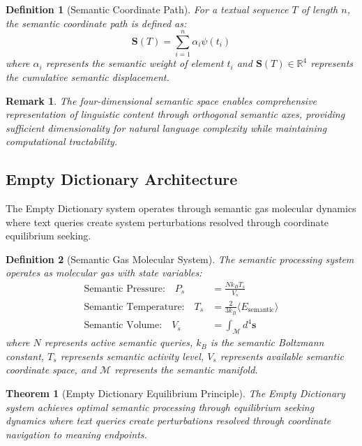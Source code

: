 \documentclass[12pt,a4paper]{article}
\newtheorem{theorem}{Theorem}
\newtheorem{definition}{Definition}
\newtheorem{remark}{Remark}
\begin{document}
\begin{definition}[Semantic Coordinate Path]
For a textual sequence $T$ of length $n$, the semantic coordinate path is defined as:
\begin{equation}
\mathbf{S}(T) = \sum_{i=1}^n \alpha_i \psi(t_i)
\end{equation}
where $\alpha_i$ represents the semantic weight of element $t_i$ and $\mathbf{S}(T) \in \mathbb{R}^4$ represents the cumulative semantic displacement.
\end{definition}

\begin{remark}
The four-dimensional semantic space enables comprehensive representation of linguistic content through orthogonal semantic axes, providing sufficient dimensionality for natural language complexity while maintaining computational tractability.
\end{remark}

\subsection{Empty Dictionary Architecture}

The Empty Dictionary system operates through semantic gas molecular dynamics where text queries create system perturbations resolved through coordinate equilibrium seeking.

\begin{definition}[Semantic Gas Molecular System]
The semantic processing system operates as molecular gas with state variables:
\begin{align}
\text{Semantic Pressure:} \quad P_s &= \frac{N k_B T_s}{V_s} \\
\text{Semantic Temperature:} \quad T_s &= \frac{2}{3k_B}\langle E_{\text{semantic}} \rangle \\
\text{Semantic Volume:} \quad V_s &= \int_{\mathcal{M}} d^4\mathbf{s}
\end{align}
where $N$ represents active semantic queries, $k_B$ is the semantic Boltzmann constant, $T_s$ represents semantic activity level, $V_s$ represents available semantic coordinate space, and $\mathcal{M}$ represents the semantic manifold.
\end{definition}

\begin{theorem}[Empty Dictionary Equilibrium Principle]
The Empty Dictionary system achieves optimal semantic processing through equilibrium seeking dynamics where text queries create perturbations resolved through coordinate navigation to meaning endpoints.
\end{theorem}
\end{document}
